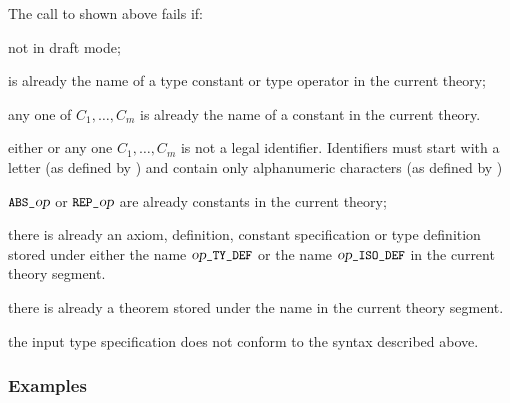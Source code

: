 The call to  shown above fails if:

\begin{myenumerate}

\item not in draft mode;

\item {} is already the name of a type constant or type operator in the
current theory;

\item any one of $C_1,\dots,C_{m}$ is already the name
of a constant in the current theory.

\item either  or any one $C_{1},\dots,C_{m}$ is not a
legal identifier.  Identifiers must start with a letter (as defined by
) and contain only alphanumeric characters (as defined by
)

\item $\ml{ABS\_}\ty{op}$
 or $\ml{REP\_}\ty{op}$
 are already constants in the
current theory;

\item there is already an axiom, definition, constant specification or type
definition stored under either the name
$\ty{op}\ml{\_TY\_DEF}$ or the name
$\ty{op}\ml{\_ISO\_DEF}$ in the current
theory segment.

\item there is already a theorem stored under the name  in the
current theory segment.

\item the input type specification does not conform to the syntax described
above.

\end{myenumerate}

\subsubsection{Examples}\label{define-type-example}

